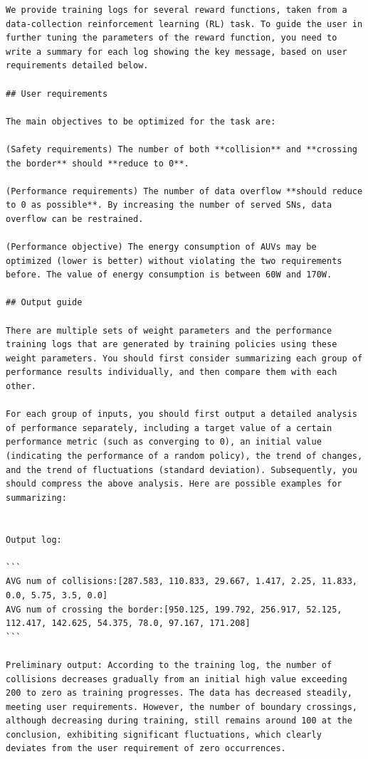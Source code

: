 \documentclass{article}
\begin{document}
\begin{verbatim}
We provide training logs for several reward functions, taken from a data-collection reinforcement learning (RL) task. To guide the user in further tuning the parameters of the reward function, you need to write a summary for each log showing the key message, based on user requirements detailed below.

## User requirements

The main objectives to be optimized for the task are: 

(Safety requirements) The number of both **collision** and **crossing the border** should **reduce to 0**.

(Performance requirements) The number of data overflow **should reduce to 0 as possible**. By increasing the number of served SNs, data overflow can be restrained.

(Performance objective) The energy consumption of AUVs may be optimized (lower is better) without violating the two requirements before. The value of energy consumption is between 60W and 170W.

## Output guide

There are multiple sets of weight parameters and the performance training logs that are generated by training policies using these weight parameters. You should first consider summarizing each group of performance results individually, and then compare them with each other.

For each group of inputs, you should first output a detailed analysis of performance separately, including a target value of a certain performance metric (such as converging to 0), an initial value (indicating the performance of a random policy), the trend of changes, and the trend of fluctuations (standard deviation). Subsequently, you should compress the above analysis. Here are possible examples for summarizing:


Output log:

```
AVG num of collisions:[287.583, 110.833, 29.667, 1.417, 2.25, 11.833, 0.0, 5.75, 3.5, 0.0]
AVG num of crossing the border:[950.125, 199.792, 256.917, 52.125, 112.417, 142.625, 54.375, 78.0, 97.167, 171.208]
```

Preliminary output: According to the training log, the number of collisions decreases gradually from an initial high value exceeding 200 to zero as training progresses. The data has decreased steadily, meeting user requirements. However, the number of boundary crossings, although decreasing during training, still remains around 100 at the conclusion, exhibiting significant fluctuations, which clearly deviates from the user requirement of zero occurrences.


\end{verbatim}
\end{document}
